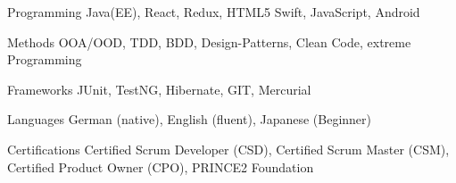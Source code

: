 

\begin{cvskills}

  \cvskill
    {Programming} %
    {Java(EE), React, Redux, HTML5 Swift, JavaScript, Android} %

  \cvskill
    {Methods} %
    {OOA/OOD, TDD, BDD, Design-Patterns, Clean Code, extreme Programming} %

  \cvskill
    {Frameworks} %
    {JUnit, TestNG, Hibernate, GIT, Mercurial} %

  \cvskill
    {Languages} %
    {German (native), English (fluent), Japanese (Beginner)} %

    \cvskill
    {Certifications} %
    {Certified Scrum Developer (CSD), Certified Scrum Master (CSM), Certified Product Owner (CPO), PRINCE2 Foundation}

\end{cvskills}

